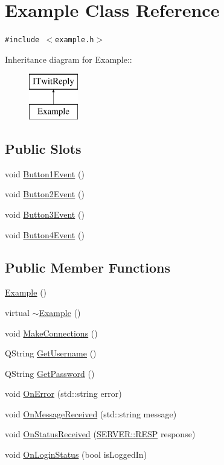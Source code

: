 \hypertarget{classExample}{
\section{Example Class Reference}
\label{classExample}
}
{\tt \#include $<$example.h$>$}

Inheritance diagram for Example::\begin{figure}[H]
\begin{center}
\leavevmode
\includegraphics[height=2cm]{classExample}
\end{center}
\end{figure}
\subsection*{Public Slots}
\begin{CompactItemize}
\item 
void \hyperlink{classExample_f30ef7aa301f3797db9500d8043dffeb}{Button1Event} ()
\item 
void \hyperlink{classExample_77c79d81f5e12da40a5f2951025ec77e}{Button2Event} ()
\item 
void \hyperlink{classExample_f41c426d8b701d076980cf2a897a1d5e}{Button3Event} ()
\item 
void \hyperlink{classExample_8cc0e75f2b00a8afd0bc056fd2112b23}{Button4Event} ()
\end{CompactItemize}
\subsection*{Public Member Functions}
\begin{CompactItemize}
\item 
\hyperlink{classExample_5c049b2b4bf7064103834620ae7cad7f}{Example} ()
\item 
virtual \hyperlink{classExample_fd58269241a2443d78fcc128ab23cc92}{$\sim$Example} ()
\item 
void \hyperlink{classExample_b873af1dbeb0620c1a243f14df215fa8}{MakeConnections} ()
\item 
QString \hyperlink{classExample_f5cb37421c35d6c2d84abb02fcc37c9f}{GetUsername} ()
\item 
QString \hyperlink{classExample_389fa677d9e04fdab94a987d2481640f}{GetPassword} ()
\item 
void \hyperlink{classExample_5036bf79a0efef457605da87dafc5bce}{OnError} (std::string error)
\item 
void \hyperlink{classExample_dfbedb6e9eeca0195736f6d3f89d25d8}{OnMessageReceived} (std::string message)
\item 
void \hyperlink{classExample_f099176fe389428fa17ccd89f6514833}{OnStatusReceived} (\hyperlink{namespaceSERVER_e274de6af58152c34520420007dfa0ea}{SERVER::RESP} response)
\item 
void \hyperlink{classExample_491e8add0ddfeca10f367f5904e232be}{OnLoginStatus} (bool isLoggedIn)
\end{CompactItemize}


